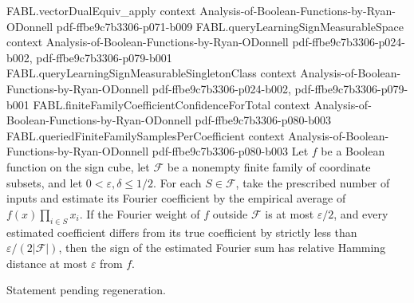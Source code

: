 \begin{theorem}
  {FABL.vectorDualEquiv_apply}
  {context}
  {Analysis-of-Boolean-Functions-by-Ryan-ODonnell}
  {pdf-ffbe9c7b3306-p071-b009}
\proofstep
  {FABL.queryLearningSignMeasurableSpace}
  {context}
  {Analysis-of-Boolean-Functions-by-Ryan-ODonnell}
  {pdf-ffbe9c7b3306-p024-b002,
    pdf-ffbe9c7b3306-p079-b001}
\proofstep
  {FABL.queryLearningSignMeasurableSingletonClass}
  {context}
  {Analysis-of-Boolean-Functions-by-Ryan-ODonnell}
  {pdf-ffbe9c7b3306-p024-b002,
    pdf-ffbe9c7b3306-p079-b001}
\proofstep
  {FABL.finiteFamilyCoefficientConfidenceForTotal}
  {context}
  {Analysis-of-Boolean-Functions-by-Ryan-ODonnell}
  {pdf-ffbe9c7b3306-p080-b003}
\proofstep
  {FABL.queriedFiniteFamilySamplesPerCoefficient}
  {context}
  {Analysis-of-Boolean-Functions-by-Ryan-ODonnell}
  {pdf-ffbe9c7b3306-p080-b003}
Let $f$ be a Boolean function on the sign cube, let $\mathcal F$ be a nonempty finite
family of coordinate subsets, and let $0<\varepsilon,\delta\le 1/2$. For each
$S\in\mathcal F$, take the prescribed number of inputs and estimate its Fourier
coefficient by the empirical average of $f(x)\prod_{i\in S}x_i$. If the Fourier weight
of $f$ outside $\mathcal F$ is at most $\varepsilon/2$, and every estimated
coefficient differs from its true coefficient by strictly less than
$\varepsilon/(2|\mathcal F|)$, then the sign of the estimated Fourier sum has relative
Hamming distance at most $\varepsilon$ from $f$.
\end{theorem}

\begin{theorem}
\label{FABL.measure_queriedFiniteFamilyFourierEstimatorOutput_failure_le}
\leanok
{}
Statement pending regeneration.
\end{theorem}

